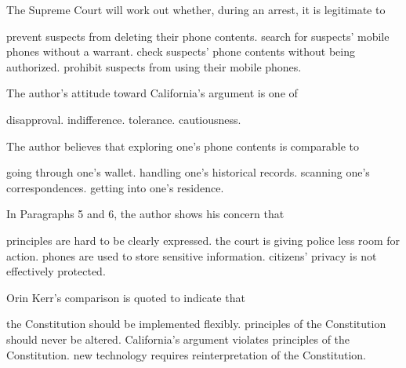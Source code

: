 \item The Supreme Court will work out whether, during an arrest, it is legitimate to
\begin{tasks}
	\task prevent suspects from deleting their phone contents.
	\task search for suspects' mobile phones without a warrant.
	\task check suspects' phone contents without being authorized.
	\task prohibit suspects from using their mobile phones.
\end{tasks}
\item The author's attitude toward California's argument is one of
\begin{tasks}
	\task disapproval.
	\task indifference.
	\task tolerance.
	\task cautiousness.
\end{tasks}
\item The author believes that exploring one's phone contents is comparable to
\begin{tasks}
	\task going through one's wallet.
	\task handling one's historical records.
	\task scanning one's correspondences.
	\task getting into one's residence.
\end{tasks}
\item In Paragraphs 5 and 6, the author shows his concern that
\begin{tasks}
	\task principles are hard to be clearly expressed.
	\task the court is giving police less room for action.
	\task phones are used to store sensitive information.
	\task citizens' privacy is not effectively protected.
\end{tasks}
\item Orin Kerr's comparison is quoted to indicate that
\begin{tasks}
	\task the Constitution should be implemented flexibly.
	\task principles of the Constitution should never be altered.
	\task California's argument violates principles of the Constitution.
	\task new technology requires reinterpretation of the Constitution.
\end{tasks}